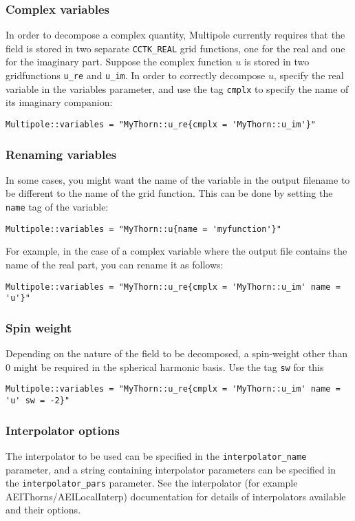 \documentclass{article}
\begin{document}
\subsubsection{Complex variables}
In order to decompose a complex quantity, Multipole currently requires
that the field is stored in two separate \verb|CCTK_REAL| grid
functions, one for the real and one for the imaginary part.  Suppose
the complex function $u$ is stored in two gridfunctions \verb|u_re|
and \verb|u_im|.  In order to correctly decompose $u$, specify the
real variable in the variables parameter, and use the tag \verb|cmplx|
to specify the name of its imaginary companion:
\begin{verbatim}
Multipole::variables = "MyThorn::u_re{cmplx = 'MyThorn::u_im'}"
\end{verbatim}

\subsubsection{Renaming variables}
In some cases, you might want the name of the variable in the output
filename to be different to the name of the grid function.  This can
be done by setting the \verb|name| tag of the variable:
\begin{verbatim}
Multipole::variables = "MyThorn::u{name = 'myfunction'}"
\end{verbatim}
For example, in the case of a complex variable where the output file
contains the name of the real part, you can rename it as follows:
\begin{verbatim}
Multipole::variables = "MyThorn::u_re{cmplx = 'MyThorn::u_im' name = 'u'}"
\end{verbatim}

\subsubsection{Spin weight}
Depending on the nature of the field to be decomposed, a 
spin-weight other than 0 might be required in the spherical harmonic basis.  Use
the tag \verb|sw| for this
\begin{verbatim}
Multipole::variables = "MyThorn::u_re{cmplx = 'MyThorn::u_im' name = 'u' sw = -2}"
\end{verbatim}

\subsubsection{Interpolator options}
The interpolator to be used can be specified in the
\verb|interpolator_name| parameter, and a string containing
interpolator parameters can be specified in the
\verb|interpolator_pars| parameter.  See the interpolator (for example
AEIThorns/AEILocalInterp) documentation for details of interpolators
available and their options.
\end{document}
